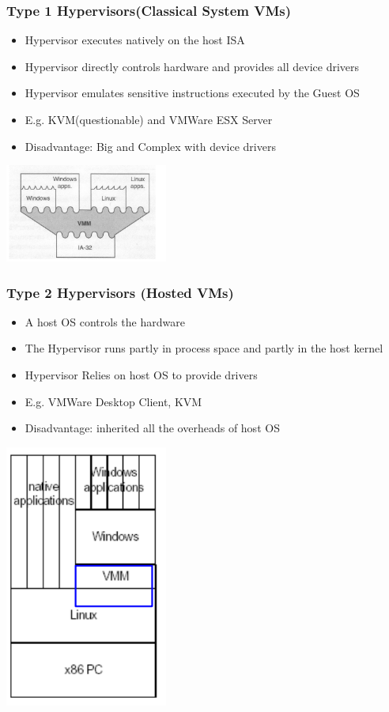 \documentclass[12pt]{article}
\begin{document}
\subsubsection{Type 1 Hypervisors(Classical System VMs)}
\begin{itemize}
    \item Hypervisor executes natively on the host ISA
    \item Hypervisor directly controls hardware and provides all device drivers
    \item Hypervisor emulates sensitive instructions executed by the Guest OS
    \item E.g. KVM(questionable) and VMWare ESX Server
    \item Disadvantage: Big and Complex with device drivers
\end{itemize}
\includegraphics[width=0.4\textwidth]{HypervisorType1.png}
\subsubsection{Type 2 Hypervisors (Hosted VMs)}
\begin{itemize}
    \item A host OS controls the hardware
    \item The Hypervisor runs partly in process space and partly in the host kernel
    \item Hypervisor Relies on host OS to provide drivers
    \item E.g. VMWare Desktop Client, KVM
    \item Disadvantage: inherited all the overheads of host OS
\end{itemize}
\includegraphics[width=0.4\textwidth]{HypervisorType2.png}
\end{document}
